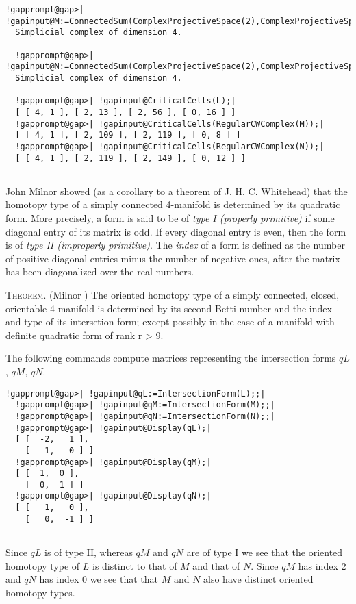 \documentclass[a4paper,11pt]{report}
\begin{document}
{{\begin{Verbatim}[commandchars=!@|,fontsize=\small,frame=single,label=Example]
  !gapprompt@gap>| !gapinput@M:=ConnectedSum(ComplexProjectiveSpace(2),ComplexProjectiveSpace(2),-1);|
  Simplicial complex of dimension 4.
  
  !gapprompt@gap>| !gapinput@N:=ConnectedSum(ComplexProjectiveSpace(2),ComplexProjectiveSpace(2),+1);|
  Simplicial complex of dimension 4.
  
  !gapprompt@gap>| !gapinput@CriticalCells(L);|
  [ [ 4, 1 ], [ 2, 13 ], [ 2, 56 ], [ 0, 16 ] ]
  !gapprompt@gap>| !gapinput@CriticalCells(RegularCWComplex(M));|
  [ [ 4, 1 ], [ 2, 109 ], [ 2, 119 ], [ 0, 8 ] ]
  !gapprompt@gap>| !gapinput@CriticalCells(RegularCWComplex(N));|
  [ [ 4, 1 ], [ 2, 119 ], [ 2, 149 ], [ 0, 12 ] ]
  
\end{Verbatim}
 John Milnor showed (as a corollary to a theorem of J. H. C. Whitehead) that
the homotopy type of a simply connected 4-manifold is determined by its
quadratic form. More precisely, a form is said to be of \emph{type I (properly primitive)} if some diagonal entry of its matrix is odd. If every diagonal entry is even,
then the form is of \emph{type II (improperly primitive)}. The \emph{index} of a form is defined as the number of positive diagonal entries minus the
number of negative ones, after the matrix has been diagonalized over the real
numbers. 

\textsc{Theorem.} (Milnor \cite{milnor}) The oriented homotopy type of a simply connected, closed, orientable
4-manifold is determined by its second Betti number and the index and type of
its intersetion form; except possibly in the case of a manifold with definite
quadratic form of rank r {\textgreater} 9. 

 The following commands compute matrices representing the intersection forms $qL$, $qM$, $qN$. 
\begin{Verbatim}[commandchars=!@|,fontsize=\small,frame=single,label=Example]
  !gapprompt@gap>| !gapinput@qL:=IntersectionForm(L);;|
  !gapprompt@gap>| !gapinput@qM:=IntersectionForm(M);;|
  !gapprompt@gap>| !gapinput@qN:=IntersectionForm(N);;|
  !gapprompt@gap>| !gapinput@Display(qL);|
  [ [  -2,   1 ],
    [   1,   0 ] ]
  !gapprompt@gap>| !gapinput@Display(qM);|
  [ [  1,  0 ],
    [  0,  1 ] ]
  !gapprompt@gap>| !gapinput@Display(qN);|
  [ [   1,   0 ],
    [   0,  -1 ] ]
  
\end{Verbatim}
 Since $qL$ is of type II, whereas $qM$ and $qN$ are of type I we see that the oriented homotopy type of $L$ is distinct to that of $M$ and that of $N$. Since $qM$ has index $2$ and $qN$ has index $0$ we see that that $M$ and $N$ also have distinct oriented homotopy types. }

}
\end{document}
